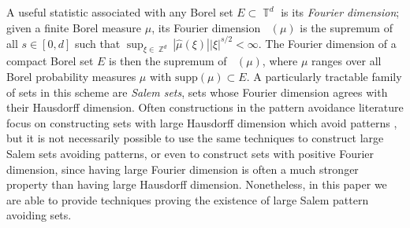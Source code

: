 \documentclass[dvipsnames,letterpaper,12pt]{article}
\numberwithin{equation}{section}
\DeclareMathOperator{\fordim}{\dim_{\mathbb{F}}}
\DeclareMathOperator{\ZZ}{\mathbb{Z}}
\DeclareMathOperator{\TT}{\mathbb{T}}
\numberwithin{theorem}{section}
\begin{document}

A useful statistic associated with any Borel set $E \subset \TT^d$ is its \emph{Fourier dimension}; given a finite Borel measure $\mu$, its Fourier dimension $\fordim(\mu)$ is the supremum of all $s \in [0,d]$ such that $\sup_{\xi \in \ZZ^d} |\widehat{\mu}(\xi)| |\xi|^{s/2} < \infty$. The Fourier dimension of a compact Borel set $E$ is then the supremum of $\fordim(\mu)$, where $\mu$ ranges over all Borel probability measures $\mu$ with $\text{supp}(\mu) \subset E$. A particularly tractable family of sets in this scheme are \emph{Salem sets}, sets whose Fourier dimension agrees with their Hausdorff dimension. Often constructions in the pattern avoidance literature focus on constructing sets with large Hausdorff dimension which avoid patterns \cite{OurPaper,PramanikFraser,Mathe}, but it is not necessarily possible to use the same techniques to construct large Salem sets avoiding patterns, or even to construct sets with positive Fourier dimension, since having large Fourier dimension is often a much stronger property than having large Hausdorff dimension. Nonetheless, in this paper we are able to provide techniques proving the existence of large Salem pattern avoiding sets.
\end{document}
